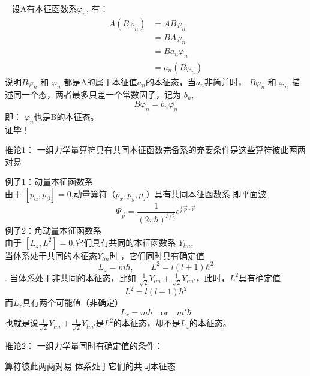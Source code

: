 \begin{frame} [allowframebreaks=]
    \证~ 设A有本征函数系{$\varphi_n$}, 有：
        \begin{equation*}
            \begin{split} 
            A(B\varphi_n)&= AB\varphi_n\\
            &=BA\varphi_n \\
            &=Ba_n\varphi_n \\
            &=a_n(B\varphi_n) 
            \end{split}  
        \end{equation*}  
        说明$B\varphi_n$ 和 $\varphi_n$ 都是A的属于本征值$a_n$的本征态，当$a_n$非简并时， 
        $B\varphi_n$ 和 $\varphi_n$ 描述同一个态，两者最多只差一个常数因子，记为 $b_n$,
        $$ B\varphi_n=b_n \varphi_n$$
        即： $\varphi_n$也是B的本征态。\\
        证毕！
\end{frame} 

\begin{frame} [allowframebreaks=]
    \begin{tcolorbox1}{推论1：}
        一组力学量算符具有共同本征函数完备系的充要条件是这些算符彼此两两对易
    \end{tcolorbox1}
    \alert{例子1：动量本征函数系} \\
    由于 $[p_\alpha,p_\beta]=0$,动量算符（$p_x, p_y, p_z$）具有共同本征函数系 即平面波\\
    $$ \Psi_{\vec p}= \frac{1}{(2\pi\hbar)^{3/2}} e^{\frac{i}{\hbar}\vec{p}\cdot\vec{r}}$$ 
    \alert{例子2：角动量本征函数系} \\
    由于 $[L_z,L^2]=0$,它们具有共同的本征函数系 {$Y_{lm}$},\\
    当体系处于共同的本征态$Y_{lm}$时 ，它们同时具有确定值
    $$L_z= m\hbar, \qquad L^2=l(l+1)\hbar ^2 $$.
    当体系处于非共同的本征态，比如 $\frac{1}{\sqrt{2}}Y_{lm} + \frac{1}{\sqrt{2}}Y_{lm'}$，此时，$L^2$具有确定值
    $$L^2=l(l+1)\hbar ^2 $$
    而$L_z$具有两个可能值（非确定）
    $$L_z= m\hbar\quad \text{or} \quad m'\hbar$$
    也就是说$\frac{1}{\sqrt{2}}Y_{lm} + \frac{1}{\sqrt{2}}Y_{lm'}$是$L^2$的本征态，却不是$L_z$的本征态。
\end{frame} 

\begin{frame}
    \begin{tcolorbox1}{推论2：}
        一组力学量同时有确定值的条件：
    \begin{enumerate}
    \Item 算符彼此两两对易
    \Item 体系处于它们的共同本征态
    \end{enumerate}
    \end{tcolorbox1}

\end{frame} 

